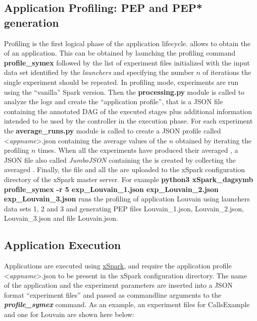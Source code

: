 \hypertarget{application-profiling}{%
\subsection{Application Profiling: PEP and PEP* generation}\label{application-profiling}}
Profiling is the first logical phase of the \tool application
lifecycle.  \tool allows to obtain the \model of an application. This can be obtained by launching the profiling command \textbf{profile\_symex} followed by the list of experiment files initialized with the input data set identified by the \dSymb \textit{launchers} and specifying the number $n$ of iterations the single experiment should be repeated. In profiling mode, experiments are run using the ``vanilla'' Spark version. Then the \textbf{processing.py} module is called to analyze the logs and create the ``application profile'', that is a JSON
file containing the annotated DAG of the executed stages plus additional information intended to be used by the controller in the execution phase. For each experiment the  \textbf{average\_runs.py} module is called to create a JSON profile called  <\emph{appname}>.json containing the average values of the $n$ \plans obtained by iterating the 
profiling $n$ times. When all the experiments have produced their averaged \plan, a JSON file also called \textit{JumboJSON} containing the \model is created by collecting the averaged \plans. Finally, the \model file and all the \plans are uploaded to the xSpark configuration directory of the xSpark master server. For example \textbf{python3 xSpark\_dagsymb profile\_symex -r 5 exp\_Louvain\_1.json  exp\_Louvain\_2.json  exp\_Louvain\_3.json} runs the profiling of application Louvain using launchers data sets 1, 2 and 3 and generating PEP files Louvain\_1.json, Louvain\_2.json, Louvain\_3.json and \model file Louvain.json.

\hypertarget{application-execution}{%
\subsection{Application Execution}\label{application-execution}}
Applications are executed using
\href{https://github.com/gioenn/xSpark.git}{xSpark}, and require the
application profile <\emph{appname}>.json to be present in the
xSpark configuration directory. The name of the application and the experiment
parameters are inserted into a JSON format ``experiment files'' and passed as commandline
arguments to the \emph{\textbf{profile\_symex}} command. As an example, an
experiment files for CallsExample and one for Louvain are shown here below:


